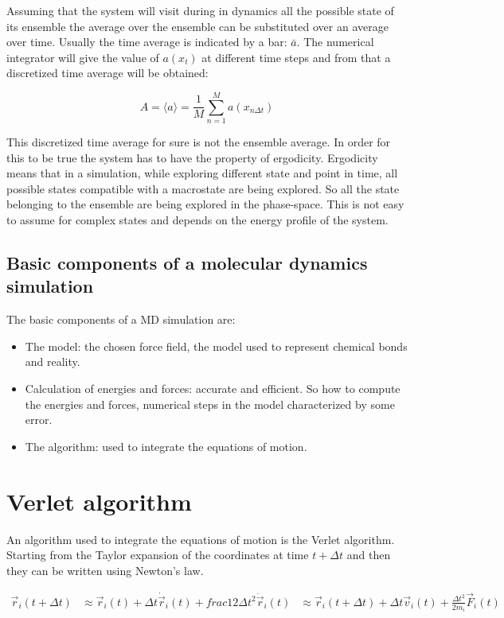 	Assuming that the system will visit during in dynamics all the possible state of its ensemble the average over the ensemble can be substituted over an average over time.
	Usually the time average is indicated by a bar: $\bar{a}$.
	The numerical integrator will give the value of $a(x_t)$ at different time steps and from that a discretized time average will be obtained:

	$$A = \langle a\rangle = \frac{1}{M}\sum\limits_{n=1}^M a(x_{n\Delta t})$$

	This discretized time average for sure is not the ensemble average.
	In order for this to be true the system has to have the property of ergodicity.
	Ergodicity means that in a simulation, while exploring different state and point in time, all possible states compatible with a macrostate are being explored.
	So all the state belonging to the ensemble are being explored in the phase-space.
	This is not easy to assume for complex states and depends on the energy profile of the system.


	\subsection{Basic components of a molecular dynamics simulation}
	The basic components of a MD simulation are:

	\begin{multicols}{2}
		\begin{itemize}
			\item The model: the chosen force field, the model used to represent chemical bonds and reality.
			\item Calculation of energies and forces: accurate and efficient.
				So how to compute the energies and forces, numerical steps in the model characterized by some error.
			\item The algorithm: used to integrate the equations of motion.

		\end{itemize}
	\end{multicols}

\section{Verlet algorithm}
An algorithm used to integrate the equations of motion is the Verlet algorithm.
Starting from the Taylor expansion of the coordinates at time $t+\Delta t$ and then they can be written using Newton's law.

\begin{align*}
	\vec{r}_i(t+\Delta t)&\approx \vec{r}_i(t) + \Delta t\dot{\vec{r}}_i(t) + frac{1}{2}\Delta t^2\ddot{\vec{r}}_i(t)
											 &\approx\vec{r}_i(t+\Delta t)+\Delta t\vec{v}_i(t)+\frac{\Delta t^2}{2m_i}\vec{F}_i(t) \\
\end{align*}


